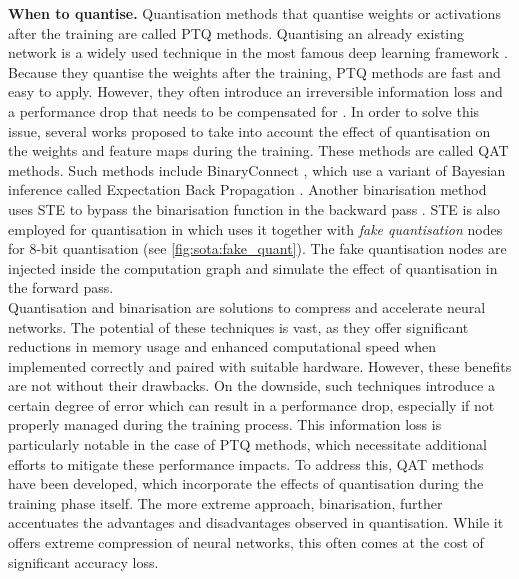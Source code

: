 \noindent\textbf{When to quantise.} Quantisation methods that quantise weights
or activations after the training are called \ac{PTQ} methods. Quantising an
already existing network is a widely used technique in the most famous deep
learning framework \cite{ncnn,qnnpack,snapdragon,tensorrt}. Because they
quantise the weights after the training, \ac{PTQ} methods are fast and easy to
apply. However, they often introduce an irreversible information loss and a
performance drop that needs to be compensated for
\cite{DBLP:journals/ijon/LiangGWSZ21}. In order to solve this issue, several
works proposed to take into account the effect of quantisation on the weights
and feature maps during the training. These methods are called \ac{QAT} methods.
Such methods include BinaryConnect \cite{courbariaux2015binaryconnect}, which
use a variant of Bayesian inference called Expectation Back Propagation
\cite{DBLP:journals/corr/ChengSML15,DBLP:conf/nips/SoudryHM14}. Another
binarisation method uses \ac{STE} \cite{DBLP:journals/corr/BengioLC13} to bypass
the binarisation function in the backward pass
\cite{DBLP:conf/nips/HubaraCSEB16}. \ac{STE} is also employed for quantisation
in \cite{DBLP:conf/cvpr/JacobKCZTHAK18} which uses it together with \emph{fake
quantisation} nodes for 8-bit quantisation (see \cref{fig:sota:fake_quant}). The
fake quantisation nodes are injected inside the computation graph and simulate
the effect of quantisation in the forward pass.\\

Quantisation and binarisation are solutions to compress and accelerate neural
networks. The potential of these techniques is vast, as they offer significant
reductions in memory usage and enhanced computational speed when implemented
correctly and paired with suitable hardware. However, these benefits are not
without their drawbacks. On the downside, such techniques introduce a certain
degree of error which can result in a performance drop, especially if not
properly managed during the training process. This information loss is
particularly notable in the case of \acl{PTQ} methods, which necessitate
additional efforts to mitigate these performance impacts. To address this,
\ac{QAT} methods have been developed, which incorporate the effects of
quantisation during the training phase itself. The more extreme approach,
binarisation, further accentuates the advantages and disadvantages observed in
quantisation. While it offers extreme compression of neural networks, this often
comes at the cost of significant accuracy loss.\\


